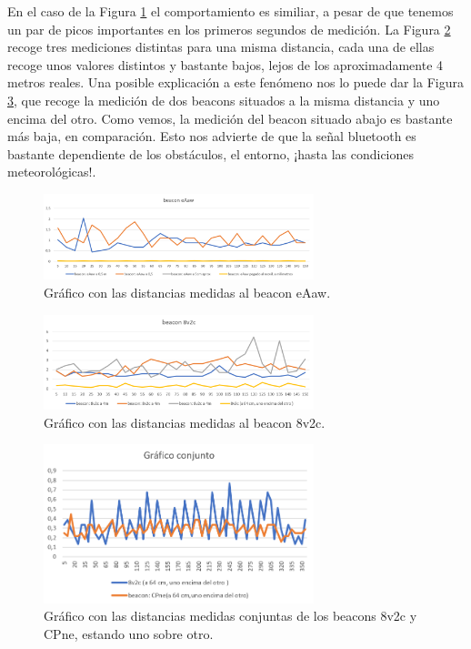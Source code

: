 En el caso de la Figura \ref{fig:dist_eAaw} el comportamiento es similiar, a pesar de que tenemos un par de picos importantes en los primeros segundos de medición. La Figura \ref{fig:dist_8v2c} recoge tres mediciones distintas para una misma distancia, cada una de ellas recoge unos valores distintos y bastante bajos, lejos de los aproximadamente 4 metros reales. Una posible explicación a este fenómeno nos lo puede dar la Figura \ref{fig:dist_conjunto}, que recoge la medición de dos beacons situados a la misma distancia y uno encima del otro. Como vemos, la medición del beacon situado abajo es bastante más baja, en comparación. Esto nos advierte de que la señal bluetooth es bastante dependiente de los obstáculos, el entorno, ¡hasta las condiciones meteorológicas!. 


\begin{figure}[t]
	\centering
	\includegraphics[width=0.7\textwidth]{Imagenes/Descripciondeltrabajo/dist_eAaw}
	\caption{Gráfico con las distancias medidas al beacon eAaw. }
	\label{fig:dist_eAaw}
\end{figure}


\begin{figure}[t]
	\centering
	\includegraphics[width=0.7\textwidth]{Imagenes/Descripciondeltrabajo/dist_8v2c}
	\caption{Gráfico con las distancias medidas al beacon 8v2c. }
	\label{fig:dist_8v2c}
\end{figure}

\begin{figure}[t]
	\centering
	\includegraphics[width=0.7\textwidth]{Imagenes/Descripciondeltrabajo/dist_conjunto}
	\caption{Gráfico con las distancias medidas conjuntas de los beacons 8v2c y CPne, estando uno sobre otro. }
	\label{fig:dist_conjunto}
\end{figure}


